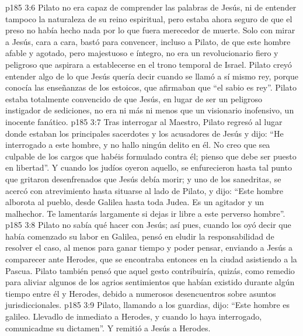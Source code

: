 \vs p185 3:6 Pilato no era capaz de comprender las palabras de Jesús, ni de entender tampoco la naturaleza de su reino espiritual, pero estaba ahora seguro de que el preso no había hecho nada por lo que fuera merecedor de muerte. Solo con mirar a Jesús, cara a cara, bastó para convencer, incluso a Pilato, de que este hombre afable y agotado, pero majestuoso e íntegro, no era un revolucionario fiero y peligroso que aspirara a establecerse en el trono temporal de Israel. Pilato creyó entender algo de lo que Jesús quería decir cuando se llamó a sí mismo rey, porque conocía las enseñanzas de los estoicos, que afirmaban que “el sabio es rey”. Pilato estaba totalmente convencido de que Jesús, en lugar de ser un peligroso instigador de sediciones, no era ni más ni menos que un visionario inofensivo, un inocente fanático.
\vs p185 3:7 Tras interrogar al Maestro, Pilato regresó al lugar donde estaban los principales sacerdotes y los acusadores de Jesús y dijo: “He interrogado a este hombre, y no hallo ningún delito en él. No creo que sea culpable de los cargos que habéis formulado contra él; pienso que debe ser puesto en libertad”. Y cuando los judíos oyeron aquello, se enfurecieron hasta tal punto que gritaron desenfrenados que Jesús debía morir; y uno de los sanedritas, se acercó con atrevimiento hasta situarse al lado de Pilato, y dijo: “Este hombre alborota al pueblo, desde Galilea hasta toda Judea. Es un agitador y un malhechor. Te lamentarás largamente si dejas ir libre a este perverso hombre”.
\vs p185 3:8 Pilato no sabía qué hacer con Jesús; así pues, cuando los oyó decir que había comenzado su labor en Galilea, pensó en eludir la responsabilidad de resolver el caso, al menos para ganar tiempo y poder pensar, enviando a Jesús a comparecer ante Herodes, que se encontraba entonces en la ciudad asistiendo a la Pascua. Pilato también pensó que aquel gesto contribuiría, quizás, como remedio para aliviar algunos de los agrios sentimientos que habían existido durante algún tiempo entre él y Herodes, debido a numerosos desencuentros sobre asuntos jurisdiccionales.
\vs p185 3:9 Pilato, llamando a los guardias, dijo: “Este hombre es galileo. Llevadlo de inmediato a Herodes, y cuando lo haya interrogado, comunicadme su dictamen”. Y remitió a Jesús a Herodes.
